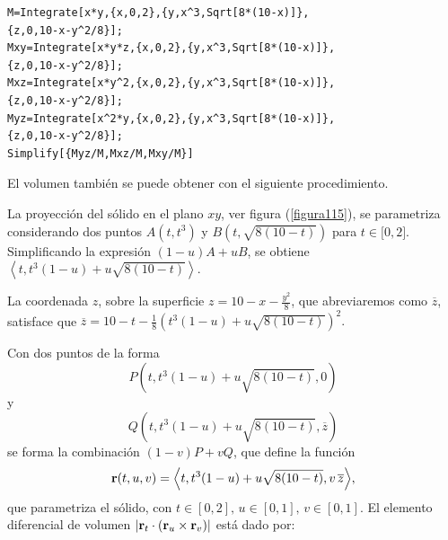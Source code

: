 \begin{tcolorbox}[title=\bf Instrucción en \verb"Mathematica"]\begin{Verbatim}[formatcom=\letraverbatim]
M=Integrate[x*y,{x,0,2},{y,x^3,Sqrt[8*(10-x)]},
{z,0,10-x-y^2/8}];
Mxy=Integrate[x*y*z,{x,0,2},{y,x^3,Sqrt[8*(10-x)]},
{z,0,10-x-y^2/8}];
Mxz=Integrate[x*y^2,{x,0,2},{y,x^3,Sqrt[8*(10-x)]},
{z,0,10-x-y^2/8}];
Myz=Integrate[x^2*y,{x,0,2},{y,x^3,Sqrt[8*(10-x)]},
{z,0,10-x-y^2/8}];
Simplify[{Myz/M,Mxz/M,Mxy/M}]
\end{Verbatim}
\end{tcolorbox}

El volumen también se puede obtener con el siguiente procedimiento.

La proyección del sólido en el plano $xy$, ver figura (\ref{figura115}),
se parametriza considerando dos puntos
{\footnotesize $A(t,t^{3})$} y {\footnotesize $B\left( t,\sqrt{8\left( 10-t\right) }\right) $} para {\footnotesize $t\in\lbrack 0,2]$.}
Simplificando la expresión {\footnotesize $(1-u)A+uB$}, se obtiene
{\footnotesize $\left\langle t,t^{3}(1-u)+u\sqrt{8\left(10-t\right) }\right\rangle$.}

La coordenada $z$, sobre la superficie $z=10-x-\frac{y^{2}}{8}$,
que abreviaremos como $\overline{z}$, satisface que
{\footnotesize $\overline{z}=10-t-\frac{1}{8}\left( t^{3}(1-u)+u\sqrt{8\left( 10-t\right) }\right) ^{2}$.}

Con dos puntos de la forma
{\small \[P\left( t,t^{3}(1-u)+u\sqrt{8\left( 10-t\right) },0\right) \]} y
{\small \[Q\left( t,t^{3}(1-u)+u\sqrt{8\left( 10-t\right) },\overline{z}\right)\]}
se forma la combinación $(1-v) P+vQ$, que define la función
%
{\small
\[{\bf r}(t,u,v)=\left\langle t,t^{3}(1-u)+u\sqrt{8(10-t) },v \,\overline{z} \right\rangle\!,\]}
%
que parametriza el sólido, con $t\in [0,2],\,u\in [0,1],\,v\in [0,1]$.
El elemento diferencial de volumen
$\left\vert {\bf r}_{t}\cdot \left({\bf r}_{u}\times {\bf r}_{v}\right) \right\vert$
está dado por:

